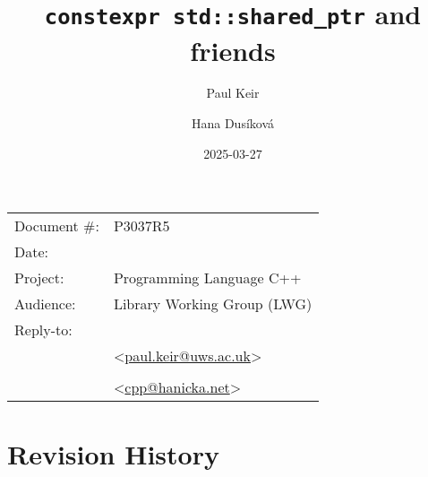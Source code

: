 \documentclass[10pt]{article}
\date{}
\title{\texttt{constexpr std::shared\_ptr} and friends}
\makeatletter
\newcommand{\emailaddressP}{paul.keir@uws.ac.uk}
\newcommand{\emailaddressH}{cpp@hanicka.net}
\newcommand{\emailP}{\href{mailto:\emailaddressP}{\emailaddressP}}
\newcommand{\emailH}{\href{mailto:\emailaddressH}{\emailaddressH}}
\makeatother
\begin{document}

\maketitle\vspace{-2cm}

\begin{flushright}
  \begin{tabular}{ll}
  Document \#:&P3037R5\\
  Date:       &\date{2025-03-27}\\
  Project:    &Programming Language C++\\
  Audience:   &Library Working Group (LWG)\\
  Reply-to:   &\author{Paul Keir}\\
              &\textless\emailP\textgreater\\
              &\author{Hana Dusíková}\\
              &\textless\emailH\textgreater
  \end{tabular}
\end{flushright}

{\hypersetup{linkcolor=black}
  \tableofcontents
}

\pagebreak

\section{Revision History}
\end{document}
